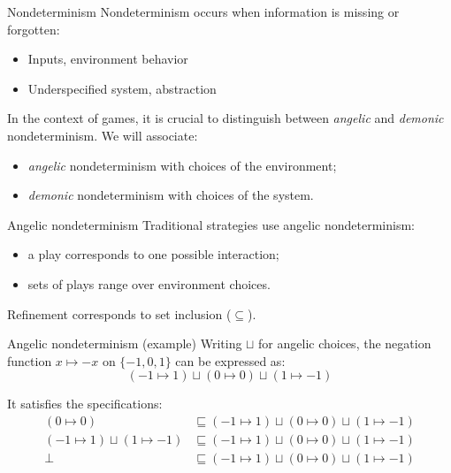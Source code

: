 \documentclass[aspectratio=54]{beamer}
\begin{document}
\begin{frame}{Nondeterminism} %
  Nondeterminism occurs
  when information is missing or forgotten:
  \begin{itemize}
    \item Inputs, environment behavior
    \item Underspecified system, abstraction
  \end{itemize}

  In the context of games,
  it is crucial to distinguish between
  \emph{angelic} and \emph{demonic}
  nondeterminism.
  We will associate:
  \begin{itemize}
    \item \emph{angelic} nondeterminism
      with choices of the environment;
    \item \emph{demonic} nondeterminism
      with choices of the system.
  \end{itemize}
\end{frame}

\begin{frame}{Angelic nondeterminism} %
  Traditional strategies use angelic nondeterminism:
  \begin{itemize}
    \item a play corresponds to one possible interaction;
    \item sets of plays range over environment choices.
  \end{itemize}
  Refinement corresponds to set inclusion ($\subseteq$).
\end{frame}

\begin{frame}{Angelic nondeterminism (example)} %
  Writing $\sqcup$ for angelic choices,
  the negation function $x \mapsto - x$ on $\{-1, 0, 1\}$
  can be expressed as:
  \[
    (-1 \mapsto 1) \sqcup (0 \mapsto 0) \sqcup (1 \mapsto -1)
  \]

  It satisfies the specifications:
  \begin{align*}
    (0 \mapsto 0) &\sqsubseteq
      (-1 \mapsto 1) \sqcup (0 \mapsto 0) \sqcup (1 \mapsto -1) \\
    (-1 \mapsto 1) \sqcup (1 \mapsto -1) &\sqsubseteq
      (-1 \mapsto 1) \sqcup (0 \mapsto 0) \sqcup (1 \mapsto -1) \\
    \bot &\sqsubseteq
      (-1 \mapsto 1) \sqcup (0 \mapsto 0) \sqcup (1 \mapsto -1)
  \end{align*}
\end{frame}
\end{document}
